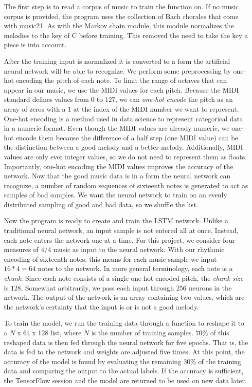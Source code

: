 The first step is to read a corpus of music to train the function on.
If no music corpus is provided, the program uses the collection of Bach chorales that come with music21.
As with the Markov chain module, this module normalizes the melodies to the key of C before training.
This removed the need to take the key a piece is into account.

After the training input is normalized it is converted to a form the artificial neural network will be able to recognize.
We perform some preprocessing by one-hot encoding the pitch of each note.
To limit the range of octaves that can appear in our music, we use the MIDI values for each pitch.
Because the MIDI standard defines values from $0$ to $127$, we can \textit{one-hot encode} the pitch as an array of zeros with a $1$ at the index of the MIDI number we want to represent.
One-hot encoding is a method used in data science to represent categorical data in a numeric format.
Even though the MIDI values are already numeric, we one-hot encode them because the difference of a half step (one MIDI value) can be the distinction between a good melody and a better melody.
Additionally, MIDI values are only ever integer values, so we do not need to represent them as floats.
Importantly, one-hot encoding the MIDI values improves the accuracy of the network.
Now that the good music data is in a form the neural network can recognize, a number of random sequences of sixteenth notes is generated to act as samples of bad samples.
We want the neural network to train on an evenly distributed sampling of good and bad data, so we shuffle the list.

Now the program is ready to create and train the LSTM network.
Unlike a traditional neural network, an input sample is not entered all at once.
Instead, each note enters the network one at a time.
For this project, we consider four measures of 4/4 music as input to the neural network.
With our rhythmic encoding of sixteenth notes, this means for each music sample we input $16 * 4 = 64$ notes to the network.
In more general terminology, each note is a \textit{chunk}.
Since each note consists of a single one-hot encoded pitch, the \textit{chunk size} is $128$.
Somewhat arbitrarily, we pass each input through $256$ neurons in the network.
The output of the network is an array containing two values, which are the network's certainty that the input is or is not a good melody.

To train the model, we run the training data through a function to reshape it to a $N$ x 64 x 128 list, where $N$ is the number of training samples.
$70\%$ of this reshaped data is then fed through the neural network for five epochs.
That is, the data is fed to the network and weights are adjusted five times.
At this point, the accuracy of the model is found by evaluating the remaining $30\%$ of the training data and comparing the output to the actual labels.
If the accuracy is sufficient, the TensorFlow session and the model are returned to be used on new data later.

